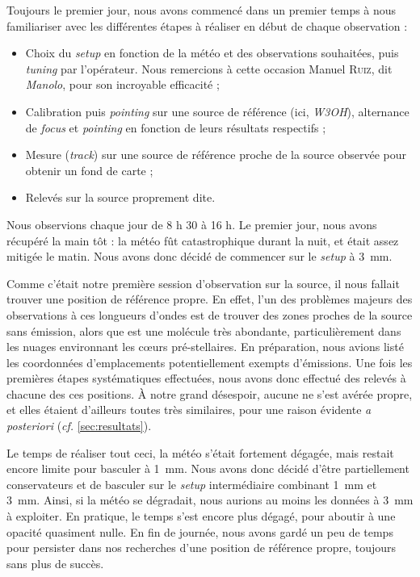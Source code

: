 \documentclass[a4paper,10pt,french]{article}
\newcommand{\setup}{\textit{setup}}
\newcommand{\troismm}{\SI{3}{\milli\meter}}
\newcommand{\unmm}{\SI{1}{\milli\meter}}
\begin{document}
Toujours le premier jour, nous avons commencé dans un premier temps à nous
familiariser avec les différentes étapes à réaliser en début de chaque
observation :
\begin{itemize}
    \item Choix du \setup{} en fonction de la météo et des observations
          souhaitées, puis \textit{tuning} par l’opérateur. Nous remercions à
          cette occasion Manuel \textsc{Ruiz}, dit \textit{Manolo}, pour son incroyable
          efficacité ;
    \item Calibration puis \textit{pointing} sur une source de référence (ici,
          \textit{W3OH}), alternance de \textit{focus} et \textit{pointing} en
          fonction de leurs résultats respectifs ;
    \item Mesure (\textit{track}) sur une source de référence proche de la
          source observée pour obtenir un fond de carte ;
    \item Relevés sur la source proprement dite.
\end{itemize}

Nous observions chaque jour de 8 h 30 à 16 h. Le premier jour, nous avons
récupéré la main tôt : la météo fût catastrophique durant la nuit, et était
assez mitigée le matin. Nous avons donc décidé de commencer sur le \setup{} à
\troismm.

Comme c’était notre première session d’observation sur la source, il nous
fallait trouver une position de référence propre. En effet, l’un des problèmes
majeurs des observations à ces longueurs d’ondes est de trouver des zones
proches de la source sans émission, alors que  est une molécule
très abondante, particulièrement dans les nuages environnant les cœurs
pré-stellaires. En préparation, nous avions listé les coordonnées
d’emplacements potentiellement exempts d’émissions. Une fois les premières
étapes systématiques effectuées, nous avons donc effectué des relevés à chacune
des ces positions. À notre grand désespoir, aucune ne s’est avérée propre, et
elles étaient d’ailleurs toutes très similaires, pour une raison évidente
\textit{a posteriori} (\textit{cf.} \cref{sec:resultats}).

Le temps de réaliser tout ceci, la météo s’était fortement dégagée, mais
restait encore limite pour basculer à \unmm. Nous avons donc décidé d’être
partiellement conservateurs et de basculer sur le \setup{} intermédiaire
combinant \unmm{} et \troismm. Ainsi, si la météo se dégradait, nous aurions au
moins les données à \troismm{} à exploiter. En pratique, le temps s’est
encore plus dégagé, pour aboutir à une opacité quasiment nulle. En fin de
journée, nous avons gardé un peu de temps pour persister dans nos recherches
d’une position de référence propre, toujours sans plus de succès.
\end{document}
